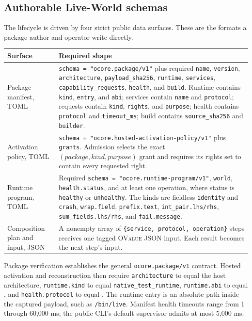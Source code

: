 \documentclass[11pt,oneside]{article}
\newcommand{\ovalue}{{\mdseries\textsc{OValue}}}
\begin{document}
\subsection{Authorable Live-World schemas}

The lifecycle is driven by four strict public data surfaces. These are the
formats a package author and operator write directly.

\begin{longtable}{P{0.20\textwidth} P{0.72\textwidth}}
\toprule
\textbf{Surface} & \textbf{Required shape} \\
\midrule
\endhead
Package manifest, TOML &
\texttt{schema = "ocore.package/v1"} plus required \texttt{name},
\texttt{version}, \texttt{architecture}, \texttt{payload\_sha256},
\texttt{runtime}, \texttt{services}, \texttt{capability\_requests},
\texttt{health}, and \texttt{build}. Runtime contains \texttt{kind},
\texttt{entry}, and \texttt{abi}; services contain \texttt{name} and
\texttt{protocol}; requests contain \texttt{kind}, \texttt{rights}, and
\texttt{purpose}; health contains \texttt{protocol} and \texttt{timeout\_ms};
build contains \texttt{source\_sha256} and \texttt{builder}. \\
Activation policy, TOML &
\texttt{schema = "ocore.hosted-activation-policy/v1"} plus
\texttt{grants}. Admission selects the exact $(package, kind, purpose)$ grant
and requires its rights set to contain every requested right. \\
Runtime program, TOML &
Required \texttt{schema = "ocore.runtime-program/v1"}, \texttt{world},
\texttt{health.status}, and at least one operation, where status is
\texttt{healthy} or \texttt{unhealthy}. The kinds are fieldless
\texttt{identity} and \texttt{crash}, \texttt{wrap.field},
\texttt{prefix.text}, \texttt{int\_pair.lhs/rhs},
\texttt{sum\_fields.lhs/rhs}, and \texttt{fail.message}. \\
Composition plan and input, JSON &
A nonempty array of \texttt{\{service, protocol, operation\}} steps receives
one tagged \ovalue{} JSON input. Each result becomes the next step's input. \\
\bottomrule
\end{longtable}

Package verification establishes the general \texttt{ocore.package/v1}
contract. Hosted activation and reconstruction then require
\texttt{architecture} to equal the host architecture,
\texttt{runtime.kind} to equal
\texttt{native\_\allowbreak test\_\allowbreak runtime},
\texttt{runtime.abi} to equal , and
\texttt{health.protocol} to equal . The runtime entry is an absolute
path inside the captured payload, such as \texttt{/bin/live}. Manifest health
timeouts range from 1 through 60,000 ms; the public CLI's default supervisor
admits at most 5,000 ms.
\end{document}
